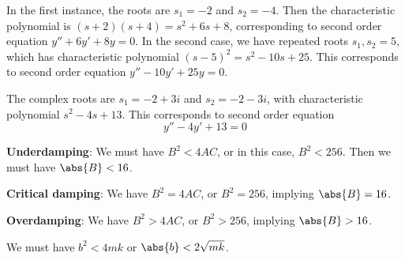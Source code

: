 \documentclass[a4paper]{article}
\begin{document}

In the first instance, the roots are \(s_{1} = -2\) and \(s_{2} = -4\). Then the characteristic polynomial is \(\!\left( s + 2 \right) \!\left( s + 4 \right) = s^{2} + 6s + 8\), corresponding to second order equation \(y'' + 6y' + 8y = 0\). In the second case, we have repeated roots \(s_{1}, s_{2} = 5\), which has characteristic polynomial \(\!\left( s - 5 \right)^{2} = s^{2} - 10s + 25\). This corresponds to second order equation \(y'' - 10y' + 25y = 0\).

\vspace{12pt}


The complex roots are \(s_{1} = -2 + 3i\) and \(s_{2} = -2 - 3i\), with characteristic polynomial \(s^{2} - 4s + 13\). This corresponds to second order equation 
\[
	y'' - 4y' + 13 = 0
\]


\textbf{Underdamping}: We must have \(B^{2} < 4AC\), or in this case, \(B^{2} < 256\). Then we must have \(\abs{B} < 16\).

\textbf{Critical damping}: We have \(B^{2} = 4AC\), or \(B^{2} = 256\), implying \(\abs{B} = 16\).

\textbf{Overdamping}: We have \(B^{2} > 4AC\), or \(B^{2} > 256\), implying \(\abs{B} > 16\).

\vspace{12pt}


We must have \(b^{2} < 4mk\) or \(\abs{b} < 2 \sqrt{mk}\).

\vspace{12pt}

\end{document}
